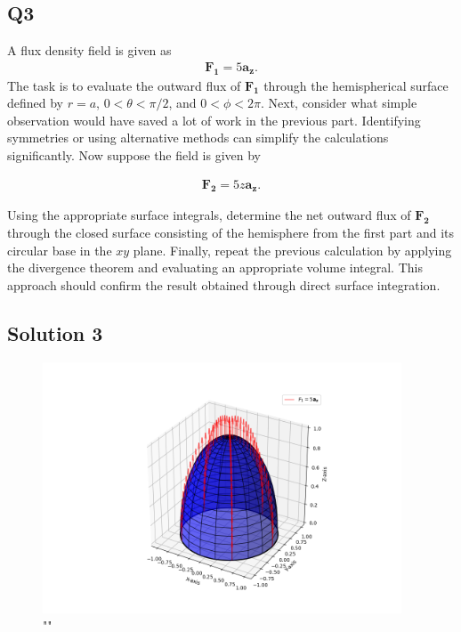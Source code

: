 \documentclass[12pt]{article}
\begin{document}
\subsection*{Q3}
A flux density field is given as
\begin{align*}
\mathbf{F_1} = 5\mathbf{a_z}.
\end{align*}
The task is to evaluate the outward flux of $\mathbf{F_1}$ through the hemispherical surface defined by $r = a$, $0 < \theta < \pi/2$, and $0 < \phi < 2\pi$. Next, consider what simple observation would have saved a lot of work in the previous part. Identifying symmetries or using alternative methods can simplify the calculations significantly. Now suppose the field is given by

\begin{align*}
\mathbf{F_2} = 5z\mathbf{a_z}.
\end{align*}

Using the appropriate surface integrals, determine the net outward flux of $\mathbf{F_2}$ through the closed surface consisting of the hemisphere from the first part and its circular base in the $xy$ plane. Finally, repeat the previous calculation by applying the divergence theorem and evaluating an appropriate volume integral. This approach should confirm the result obtained through direct surface integration.

\subsection*{Solution 3}
\begin{figure}[!ht]
    \begin{center}
        \includegraphics[width=0.95\textwidth]{./q3/fig.png}
    \end{center}
    \caption{""}
\end{figure}
\end{document}
